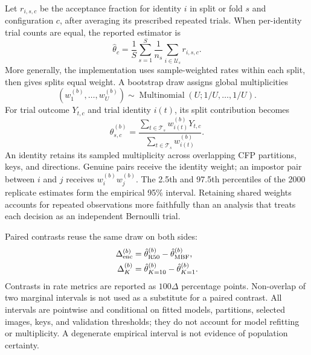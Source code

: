 
Let $r_{i,s,c}$ be the acceptance fraction for identity $i$ in split or fold $s$ and configuration $c$, after averaging its prescribed repeated trials. When per-identity trial counts are equal, the reported estimator is
\begin{equation}
 \hat\theta_c=\frac1S\sum_{s=1}^S\frac1{n_s}\sum_{i\in\mathcal U_s}r_{i,s,c}.
\end{equation}
More generally, the implementation uses sample-weighted rates within each split, then gives splits equal weight. A bootstrap draw assigns global multiplicities
\begin{equation}
 (w_1^{(b)},\ldots,w_U^{(b)})\sim
 \operatorname{Multinomial}(U;1/U,\ldots,1/U).
\end{equation}
For trial outcome $Y_{t,c}$ and trial identity $i(t)$, its split contribution becomes
\begin{equation}
 \hat\theta_{s,c}^{(b)}=
 \frac{\sum_{t\in\mathcal T_s}w_{i(t)}^{(b)}Y_{t,c}}
 {\sum_{t\in\mathcal T_s}w_{i(t)}^{(b)}}.
\label{eq:bootstrap}
\end{equation}
An identity retains its sampled multiplicity across overlapping CFP partitions, keys, and directions. Genuine pairs receive the identity weight; an impostor pair between $i$ and $j$ receives $w_i^{(b)}w_j^{(b)}$. The 2.5th and 97.5th percentiles of the 2000 replicate estimates form the empirical 95\% interval. Retaining shared weights accounts for repeated observations more faithfully than an analysis that treats each decision as an independent Bernoulli trial.

Paired contrasts reuse the same draw on both sides:
\begin{align}
 \Delta_{\rm enc}^{(b)}&=\hat\theta_{\rm R50}^{(b)}-\hat\theta_{\rm MBF}^{(b)},\\
 \Delta_K^{(b)}&=\hat\theta_{K=10}^{(b)}-\hat\theta_{K=1}^{(b)}.
\end{align}
Contrasts in rate metrics are reported as $100\Delta$ percentage points. Non-overlap of two marginal intervals is not used as a substitute for a paired contrast. All intervals are pointwise and conditional on fitted models, partitions, selected images, keys, and validation thresholds; they do not account for model refitting or multiplicity. A degenerate empirical interval is not evidence of population certainty.
